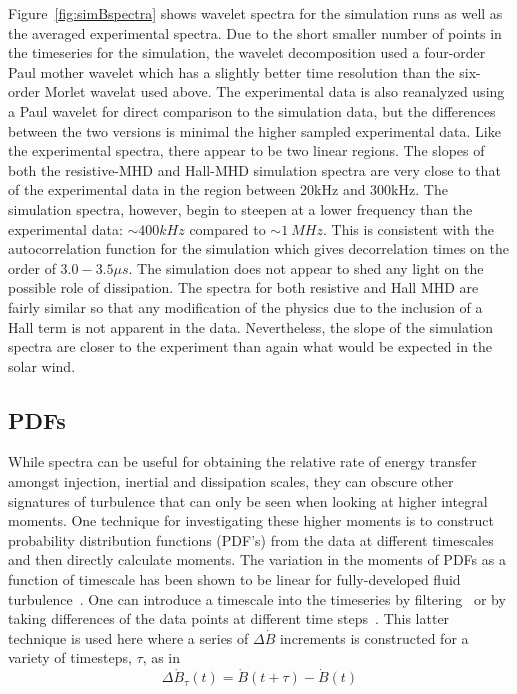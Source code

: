 \documentclass[12pt]{iopart}
\begin{document}
Figure~\ref{fig:simBspectra} shows wavelet spectra for the simulation runs as well as the averaged experimental spectra. Due to the short smaller number of points in the timeseries for the simulation, the wavelet decomposition used a four-order Paul mother wavelet  which has a slightly better time resolution than the six-order Morlet wavelat used above. The experimental data is also reanalyzed using a Paul wavelet for direct comparison to the simulation data, but the differences between the two versions is minimal the higher sampled experimental data. Like the experimental spectra, there appear to be two linear regions. The slopes of both the resistive-MHD and Hall-MHD simulation spectra are very close to that of the experimental data in the region between 20kHz and 300kHz. The simulation spectra, however, begin to steepen at a lower frequency than the experimental data: $\sim 400kHz$ compared to $\sim 1~MHz$. This is consistent with the autocorrelation function for the simulation which gives decorrelation times on the order of $3.0-3.5 \mu s$. The simulation does not appear to shed any light on the possible role of dissipation. The spectra for both resistive and Hall MHD are fairly similar so that any modification of the physics due to the inclusion of a Hall term is not apparent in the data. Nevertheless, the slope of the simulation spectra are closer to the experiment than again what would be expected in the solar wind.

\subsection{PDFs}

While spectra can be useful for obtaining the relative rate of energy transfer amongst injection, inertial and dissipation scales, they can obscure other signatures of turbulence that can only be seen when looking at higher integral moments. One technique for investigating these higher moments is to construct probability distribution functions (PDF's) from the data at different timescales and then directly calculate moments. The variation in the moments of PDFs as a function of timescale has been shown to be linear for fully-developed fluid turbulence~\cite{frisch95}. One can introduce a timescale into the timeseries by filtering~\cite{frisch95,wan12_apj} or by taking differences of the data points at different time steps~\cite{Greco08,Greco09}. This latter technique is used here where a series of $\Delta \dot{B}$ increments is constructed for a variety of timesteps, $\tau$, as in
\begin{equation}
\Delta \dot{B}_{\tau}(t) = \dot{B}(t+\tau)-\dot{B}(t)
\label{eq:increments}
\end{equation}
\end{document}
